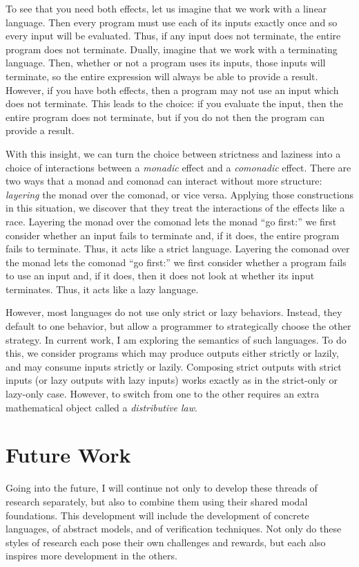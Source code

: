 \documentclass{article}
\theoremstyle{definition}
\begin{document}
To see that you need both effects, let us imagine that we work with a linear language.
Then every program must use each of its inputs exactly once and so every input will be evaluated.
Thus, if any input does not terminate, the entire program does not terminate.
Dually, imagine that we work with a terminating language.
Then, whether or not a program uses its inputs, those inputs will terminate, so the entire expression will always be able to provide a result.
However, if you have both effects, then a program may not use an input which does not terminate.
This leads to the choice: if you evaluate the input, then the entire program does not terminate, but if you do not then the program can provide a result.

With this insight, we can turn the choice between strictness and laziness into a choice of interactions between a \emph{monadic} effect and a \emph{comonadic} effect.
There are two ways that a monad and comonad can interact without more structure: \emph{layering} the monad over the comonad, or vice versa.
Applying those constructions in this situation, we discover that they treat the interactions of the effects like a race.
Layering the monad over the comonad lets the monad ``go first:'' we first consider whether an input fails to terminate and, if it does, the entire program fails to terminate.
Thus, it acts like a strict language.
Layering the comonad over the monad lets the comonad ``go first:'' we first consider whether a program fails to use an input and, if it does, then it does not look at whether its input terminates.
Thus, it acts like a lazy language.

However, most languages do not use only strict or lazy behaviors.
Instead, they default to one behavior, but allow a programmer to strategically choose the other strategy.
In current work, I am exploring the semantics of such languages.
To do this, we consider programs which may produce outputs either strictly or lazily, and may consume inputs strictly or lazily.
Composing strict outputs with strict inputs (or lazy outputs with lazy inputs) works exactly as in the strict-only or lazy-only case.
However, to switch from one to the other requires an extra mathematical object called a \emph{distributive law}.
\fi

\section*{Future Work}

Going into the future, I will continue not only to develop these threads of research separately, but also to combine them using their shared modal foundations.
This development will include the development of concrete languages, of abstract models, and of verification techniques.
Not only do these styles of research each pose their own challenges and rewards, but each also inspires more development in the others.
\end{document}
